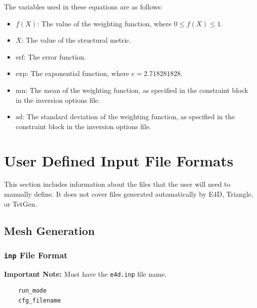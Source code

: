 \documentclass[a4paper,12pt]{article}
\begin{document}
The variables used in these equations are as follows:

\begin{itemize}
    \item \(f(X)\): The value of the weighting function, where \(0 \leq f(X) \leq 1\).
    \item \(X\): The value of the structural metric.
    \item \(\text{erf}\): The error function.
    \item \(\text{exp}\): The exponential function, where \(e = 2.718281828\).
    \item \(\text{mn}\): The mean of the weighting function, as specified in the constraint block in the inversion options file.
    \item \(\text{sd}\): The standard deviation of the weighting function, as specified in the constraint block in the inversion options file.
\end{itemize}








\section{User Defined Input File Formats}

This section includes information about the files that the user will need to manually define. It does not cover files generated automatically by E4D, Triangle, or TetGen.



\subsection{Mesh Generation}

\subsubsection{\texttt{inp} File Format} \label{mesh_inp}

\begin{framed}
\noindent \textbf{Important Note:} Must have the \texttt{e4d.inp} file name.
\end{framed}

\begin{framed}
\begin{verbatim}
    run_mode
    cfg_filename
\end{verbatim}
\end{framed}
\end{document}
